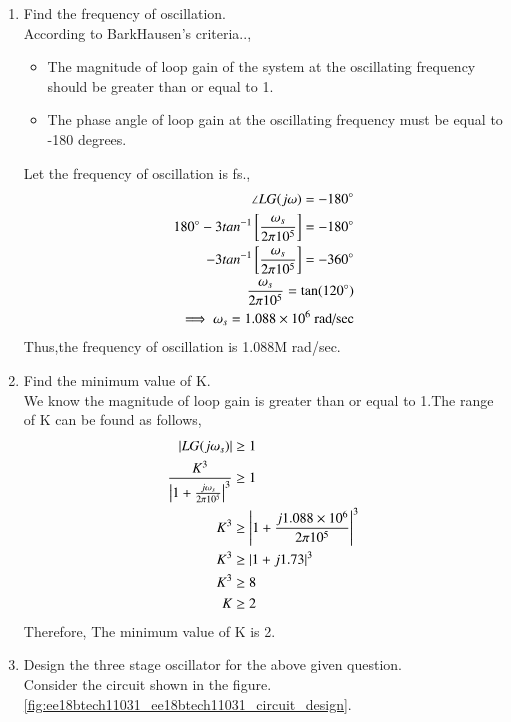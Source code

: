 \begin{enumerate}[label=\arabic*.,ref=\theenumi]
\item Find the frequency of oscillation.\\
\solution According to BarkHausen's criteria..,
\begin{itemize}
    \item The magnitude of loop gain of the system at the oscillating frequency should be greater than or equal to 1.
    \item The phase angle of loop gain at the oscillating frequency must be equal to -180 degrees.
\end{itemize}
Let the frequency of oscillation is fs.,
\begin{align}
    \angle LG(j\omega) = -180\degree\\
    180\degree - 3tan^{-1}{}\left[\frac{\omega_s}{2\pi10^5}\right] = -180\degree \\
    - 3tan^{-1}{}\left[\frac{\omega_s}{2\pi10^5}\right] = -360\degree\\
    \frac{\omega_s}{2\pi10^5} =  \tan(120\degree)\\
    \implies \omega_s = 1.088\times10^6\text{ rad/sec}\label{eq:ee18btech11031_frequency}
\end{align}
Thus,the frequency of oscillation is 1.088M rad/sec.
\item Find the minimum value of K.\\
\solution 
We know the magnitude of loop gain is greater than or equal to 1.The range of K can be found as follows,
\begin{align}
    \left\vert LG(j\omega_s)\right\vert &\geq 1 \\
    \frac{K^3}{\left\vert1+\frac{j\omega_s}{2\pi10^5}\right\vert^3} &\geq 1 \\
    K^3 &\geq \left\vert1+\frac{j1.088\times10^6}{2\pi10^5}\right\vert^3\\
     K^3 &\geq \left\vert1+j1.73\right\vert^3\\
     K^3 &\geq 8 \\
     K &\geq 2
\end{align}
Therefore, The minimum value of K is 2.
\item Design the three stage oscillator for the above given question.
\\
\solution Consider the circuit shown in the figure.\ref{fig:ee18btech11031_ee18btech11031_circuit_design}.\\
\begin{figure}[!hbt]
	\begin{center}
			\resizebox{\columnwidth}{!}{}

\end{center}
\end{figure}
\end{enumerate}
